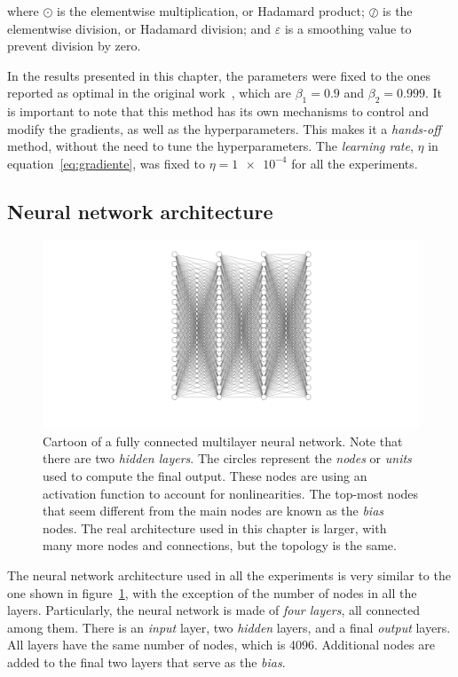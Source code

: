 where $\odot$ is the elementwise multiplication, or Hadamard product; $\oslash$
is the elementwise division, or Hadamard division; and $\varepsilon$ is a smoothing
value to prevent division by zero.

In the results presented in this chapter, the parameters were fixed to the ones reported
as optimal in the original work~\cite{kingmaAdamMethodStochastic2017}, which are
$\beta_1=\num{0.9}$ and $\beta_2=\num{0.999}$. It is important to note that this method
has its own mechanisms to control and modify the gradients, as well as the hyperparameters.
This makes it a \emph{hands-off} method, without the need to tune the hyperparameters.
The \emph{learning rate}, $\eta$ in equation~\eqref{eq:gradiente}, was fixed to
$\eta=\num{1e-4}$ for all the experiments.

\subsection{Neural network architecture}

\begin{figure}[t]
    \includegraphics[width=\textwidth]{figuras/capitulo-3/neural-network.pdf}
    \vspace{-1.5cm}
    \caption[General schematics of a neural network.]{Cartoon of a fully connected multilayer neural network. Note that there are two \emph{hidden layers}. The circles represent the \emph{nodes} or \emph{units} used to compute the final output. These nodes are using an activation function to account for nonlinearities. The top-most nodes that seem different from the main nodes are known as the \emph{bias} nodes. The real architecture used in this chapter is larger, with many more nodes and connections, but the topology is the same.}
    \label{fig:nn-esquema}
\end{figure}

The neural network architecture used in all the experiments is very similar to the one
shown in figure~\ref{fig:nn-esquema}, with the exception of the number of nodes in all the
layers.
Particularly, the neural network is made of \emph{four layers}, all connected among them.
There is an \emph{input} layer, two \emph{hidden} layers, and a final \emph{output} layers.
All layers have the same number of nodes, which is 4096. Additional nodes are added to the
final two layers that serve as the \emph{bias}.

